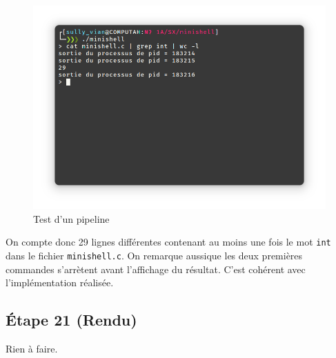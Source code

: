 \documentclass{article}
\begin{document}
\begin{figure}[H]
    \centering
    \includegraphics[width=\textwidth]{./resources/E20.png}
    \caption{Test d'un pipeline}
\end{figure}

On compte donc 29 lignes différentes contenant au moins une fois le mot \texttt{int} dans le fichier \texttt{minishell.c}. On remarque aussique les deux premières commandes s'arrètent avant l'affichage du résultat. C'est cohérent avec l'implémentation réalisée.

\subsection*{Étape 21 (Rendu)}

Rien à faire.
\end{document}
